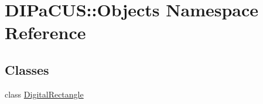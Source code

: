 \hypertarget{namespaceDIPaCUS_1_1Objects}{}\section{D\+I\+Pa\+C\+US\+:\+:Objects Namespace Reference}
\label{namespaceDIPaCUS_1_1Objects}
\subsection*{Classes}
\begin{DoxyCompactItemize}
\item 
class \mbox{\hyperlink{classDIPaCUS_1_1Objects_1_1DigitalRectangle}{Digital\+Rectangle}}
\end{DoxyCompactItemize}
